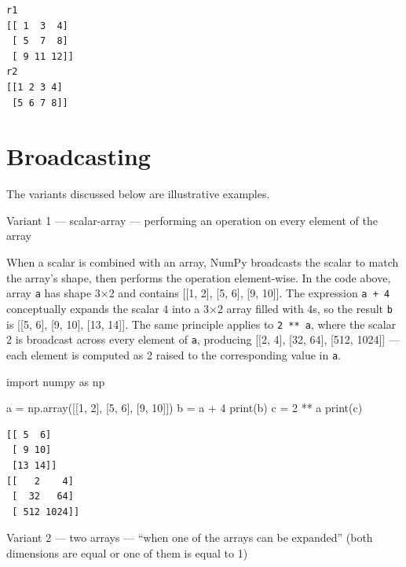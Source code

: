 \documentclass[
  english,
  letterpaper,
  DIV=11,
  numbers=noendperiod]{scrreprt}
\newenvironment{Shaded}{\begin{snugshade}}{\end{snugshade}}
\newcommand{\BuiltInTok}[1]{\textcolor[rgb]{0.00,0.23,0.31}{#1}}
\newcommand{\DecValTok}[1]{\textcolor[rgb]{0.68,0.00,0.00}{#1}}
\newcommand{\ImportTok}[1]{\textcolor[rgb]{0.00,0.46,0.62}{#1}}
\newcommand{\NormalTok}[1]{\textcolor[rgb]{0.00,0.23,0.31}{#1}}
\newcommand{\OperatorTok}[1]{\textcolor[rgb]{0.37,0.37,0.37}{#1}}
\begin{document}
\begin{verbatim}
r1
[[ 1  3  4]
 [ 5  7  8]
 [ 9 11 12]]
r2
[[1 2 3 4]
 [5 6 7 8]]
\end{verbatim}

\chapter{Broadcasting}\label{broadcasting}

The variants discussed below are illustrative examples.

Variant 1 --- scalar-array --- performing an operation on every element
of the array

When a scalar is combined with an array, NumPy broadcasts the scalar to
match the array's shape, then performs the operation element-wise. In
the code above, array \texttt{a} has shape 3×2 and contains {[}{[}1,
2{]}, {[}5, 6{]}, {[}9, 10{]}{]}. The expression \texttt{a\ +\ 4}
conceptually expands the scalar 4 into a 3×2 array filled with 4s, so
the result \texttt{b} is {[}{[}5, 6{]}, {[}9, 10{]}, {[}13, 14{]}{]}.
The same principle applies to \texttt{2\ **\ a}, where the scalar 2 is
broadcast across every element of \texttt{a}, producing {[}{[}2, 4{]},
{[}32, 64{]}, {[}512, 1024{]}{]} --- each element is computed as 2
raised to the corresponding value in \texttt{a}.

\begin{Shaded}
\begin{Highlighting}[]
\ImportTok{import}\NormalTok{ numpy }\ImportTok{as}\NormalTok{ np}

\NormalTok{a }\OperatorTok{=}\NormalTok{ np.array([[}\DecValTok{1}\NormalTok{, }\DecValTok{2}\NormalTok{], [}\DecValTok{5}\NormalTok{, }\DecValTok{6}\NormalTok{], [}\DecValTok{9}\NormalTok{, }\DecValTok{10}\NormalTok{]])}
\NormalTok{b }\OperatorTok{=}\NormalTok{ a }\OperatorTok{+} \DecValTok{4}
\BuiltInTok{print}\NormalTok{(b)}
\NormalTok{c }\OperatorTok{=} \DecValTok{2} \OperatorTok{**}\NormalTok{ a}
\BuiltInTok{print}\NormalTok{(c)}
\end{Highlighting}
\end{Shaded}

\begin{verbatim}
[[ 5  6]
 [ 9 10]
 [13 14]]
[[   2    4]
 [  32   64]
 [ 512 1024]]
\end{verbatim}

Variant 2 --- two arrays --- ``when one of the arrays can be expanded''
(both dimensions are equal or one of them is equal to 1)
\end{document}
